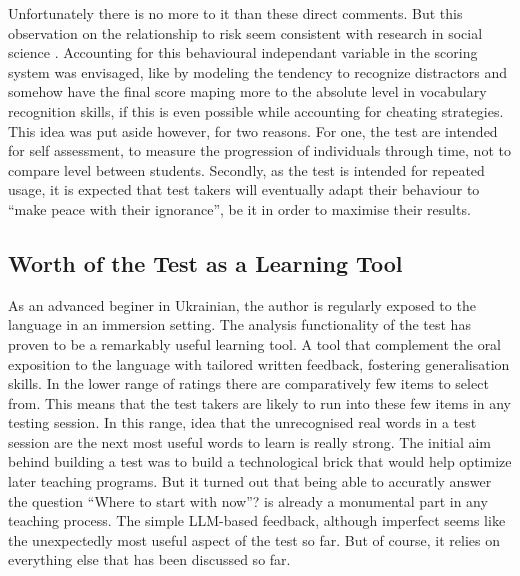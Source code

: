Unfortunately there is no more to it than these direct comments. But this observation on the relationship to risk seem consistent with research in social science \parencite{wang_does_2023}. Accounting for this behavioural independant variable in the scoring system was envisaged, like by modeling the tendency to recognize distractors and somehow have the final score maping more to the absolute level in vocabulary recognition skills, if this is even possible while accounting for cheating strategies. This idea was put aside however, for two reasons. For one, the test are intended for self assessment, to measure the progression of individuals through time, not to compare level between students. Secondly, as the test is intended for repeated usage, it is expected that test takers will eventually adapt their behaviour to ``make peace with their ignorance'', be it in order to maximise their results.

\subsection{Worth of the Test as a Learning Tool}
As an advanced beginer in Ukrainian, the author is regularly exposed to the language in an immersion setting. The analysis functionality of the test has proven to be a remarkably useful learning tool. A tool that complement the oral exposition to the language with tailored written feedback, fostering generalisation skills. In the lower range of ratings there are comparatively few items to select from. This means that the test takers are likely to run into these few items in any testing session. In this range, idea that the unrecognised real words in a test session are the next most useful words to learn is really strong. The initial aim behind building a test was to build a technological brick that would help optimize later teaching programs. But it turned out that being able to accuratly answer the question ``Where to start with now''? is already a monumental part in any teaching process. The simple LLM-based feedback, although imperfect seems like the unexpectedly most useful aspect of the test so far. But of course, it relies on everything else that has been discussed so far.

